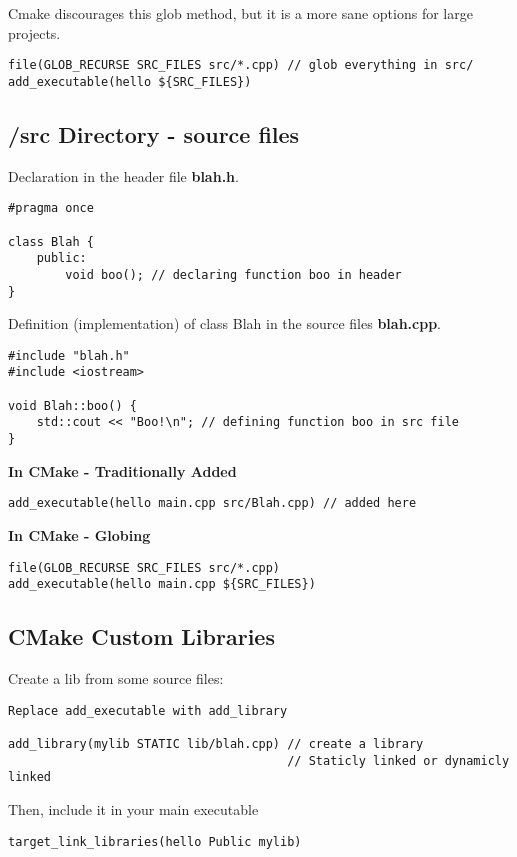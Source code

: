 Cmake discourages this glob method, but it is a more sane options for large projects.

\begin{verbatim}
file(GLOB_RECURSE SRC_FILES src/*.cpp) // glob everything in src/
add_executable(hello ${SRC_FILES})
\end{verbatim}

\subsection{/src Directory - source files}

Declaration in the header file \textbf{blah.h}.
\begin{verbatim}
#pragma once

class Blah {
    public:
        void boo(); // declaring function boo in header
}
\end{verbatim}

Definition (implementation) of class Blah in the source files \textbf{blah.cpp}.
\begin{verbatim}
#include "blah.h"
#include <iostream>

void Blah::boo() {
    std::cout << "Boo!\n"; // defining function boo in src file
}
\end{verbatim}

\textbf{In CMake - Traditionally Added}
\begin{verbatim}
add_executable(hello main.cpp src/Blah.cpp) // added here
\end{verbatim}

\textbf{In CMake - Globing}
\begin{verbatim}
file(GLOB_RECURSE SRC_FILES src/*.cpp)
add_executable(hello main.cpp ${SRC_FILES})
\end{verbatim}

\subsection{CMake Custom Libraries}

Create a lib from some source files:

\begin{verbatim}
Replace add_executable with add_library

add_library(mylib STATIC lib/blah.cpp) // create a library
                                       // Staticly linked or dynamicly linked
\end{verbatim}

Then, include it in your main executable
\begin{verbatim}
target_link_libraries(hello Public mylib)
\end{verbatim}

